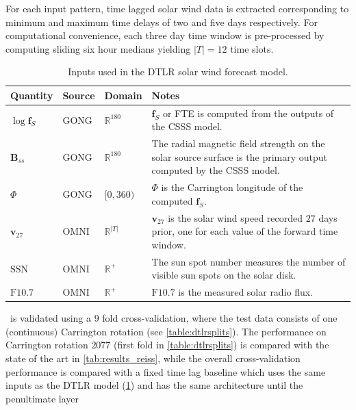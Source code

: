 For each input pattern, time lagged solar wind data is extracted corresponding to minimum and 
maximum time delays of two and five days respectively. For computational convenience, each three 
day time window is pre-processed by computing sliding six hour medians yielding $|T| = 12$ time 
slots.
%
\begin{table}[ht]
    \centering
    \begin{tabular}{l l l p{}}
        \hline
        \textbf{Quantity} & \textbf{Source} & \textbf{Domain} & \textbf{Notes}\\
        \hline
        \vspace{5pt}
          $\log \mathbf{f}_S$ & 
          GONG & 
          $\mathbb{R}^{180}$ & 
          $\mathbf{f}_S$ or FTE is computed from the outputs of the CSSS model.\\
          $\mathbf{B}_{ss}$ & 
          GONG & 
          $\mathbb{R}^{180}$  & 
          The radial magnetic field strength on the solar source surface is the primary output computed by the CSSS model.\\
          $\Phi$ & 
          GONG & 
          $[0, 360)$ & 
          $\Phi$ is the Carrington longitude of the computed $\mathbf{f}_S$.\\
          $\mathbf{v}_{27}$ & 
          OMNI & 
          $\mathbb{R}^{\rvert T \rvert}$ & 
          $\mathbf{v}_{27}$ is the solar wind speed recorded $27$ days prior, one for each value of the forward time window. \\
          $\mathrm{SSN}$ & OMNI & $\mathbb{R}^{+}$ & The sun spot number measures the number of visible sun spots on the solar disk. \\
          $\mathrm{F}10.7$ & OMNI & $\mathbb{R}^{+}$ & $\mathrm{F}10.7$ is the measured solar radio flux. \\
        \hline
    \end{tabular}
    \caption{Inputs used in the DTLR solar wind forecast model.}
    \label{table:dtlrInputs}
\end{table}
%
\XX\ is validated using a $9$ fold cross-validation, where the test data consists of one 
(continuous) Carrington rotation (see \cref{table:dtlrsplits}). The performance on Carrington 
rotation $2077$ (first fold in \cref{table:dtlrsplits}) is compared with the state of the art 
\citep{Riley2011} in \cref{tab:results_reiss}, while the overall cross-validation performance 
is compared with a fixed time lag baseline which uses the same inputs as the DTLR model 
(\cref{table:dtlrInputs}) and has the same architecture until the penultimate layer 
